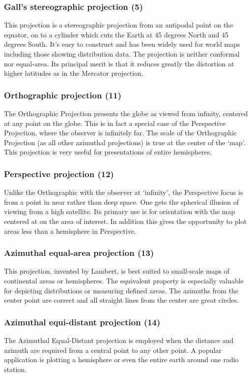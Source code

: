 \documentclass[titlepage,a4paper]{article}
\begin{document}
\subsubsection*{Gall's stereographic projection (5)}
This projection is a stereographic projection from an antipodal point on the
equator, on to a cylinder which cuts the Earth at 45 degrees North and 45
degrees South. It's easy to construct and has been widely used for world maps
including those showing distribution data. The projection is neither conformal
nor equal-area. Its principal merit is that it reduces greatly the
distortion at higher latitudes as in the Mercator projection.

\subsubsection*{Orthographic projection (11)}
The Orthographic Projection presents the globe as viewed from infinity,
centered at any point on the globe. This is in fact a special case of the
Perspective Projection, where the observer is infinitely far. The scale of
the Orthographic Projection (as all other azimuthal projections) is true at
the center of the `map'. This projection is very useful for presentations of
entire hemispheres.

\subsubsection*{Perspective projection (12)}
Unlike the Orthographic with the observer at `infinity', the Perspective
focus is from a point in near rather than deep space. One gets the spherical
illusion of viewing from a high satellite. Its primary use is for orientation
with the map centered at on the area of interest. In addition this gives the
opportunity to plot areas less than a hemisphere in Perspective.

\subsubsection*{Azimuthal equal-area projection (13)}
This projection, invented by Lambert, is best suited to small-scale maps
of continental areas or hemispheres. The equivalent property is especially
valuable for depicting distributions or measuring defined areas. The azimuths
from the center point are correct and all straight lines from the center are
great circles.

\subsubsection*{Azimuthal equi-distant projection (14)}
The Azimuthal Equal-Distant projection is employed when the distance and azimuth
are required from a central point to any other point. A popular application
is plotting a hemisphere or even the entire earth around one radio station.
\end{document}
